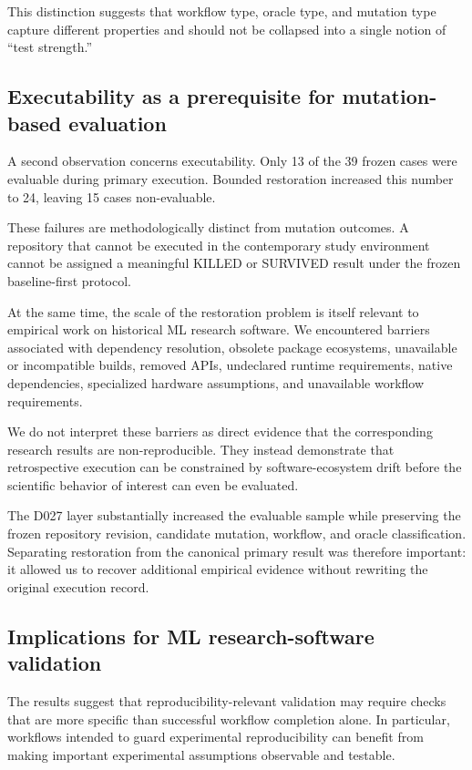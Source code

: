 This distinction suggests that workflow type, oracle type, and mutation type
capture different properties and should not be collapsed into a single notion
of ``test strength.''


\subsection{Executability as a prerequisite for mutation-based evaluation}
\label{sec:discussion-executability}

A second observation concerns executability. Only 13 of the 39 frozen
cases were evaluable during primary execution. Bounded restoration increased
this number to 24, leaving 15 cases non-evaluable.

These failures are methodologically distinct from mutation outcomes. A
repository that cannot be executed in the contemporary study environment
cannot be assigned a meaningful KILLED or SURVIVED result under the frozen
baseline-first protocol.

At the same time, the scale of the restoration problem is itself relevant to
empirical work on historical ML research software. We encountered barriers
associated with dependency resolution, obsolete package ecosystems, unavailable
or incompatible builds, removed APIs, undeclared runtime requirements, native
dependencies, specialized hardware assumptions, and unavailable workflow
requirements.

We do not interpret these barriers as direct evidence that the corresponding
research results are non-reproducible. They instead demonstrate that
retrospective execution can be constrained by software-ecosystem drift before
the scientific behavior of interest can even be evaluated.

The D027 layer substantially increased the evaluable sample while preserving
the frozen repository revision, candidate mutation, workflow, and oracle
classification. Separating restoration from the canonical primary result was
therefore important: it allowed us to recover additional empirical evidence
without rewriting the original execution record.


\subsection{Implications for ML research-software validation}
\label{sec:discussion-implications}

The results suggest that reproducibility-relevant validation may require checks
that are more specific than successful workflow completion alone. In
particular, workflows intended to guard experimental reproducibility can
benefit from making important experimental assumptions observable and
testable.

